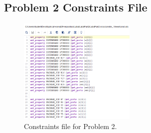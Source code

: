 \documentclass[11pt]{article}
\begin{document}
\begin{appendices}
\section{Problem 2 Constraints File}
\begin{figure}[H]
\begin{center}
	\includegraphics[width=0.5\textwidth]{../report-images/Part2Const.png}
	\caption{\label{fig:Part2ConstFile}Constraints file for Problem 2.}
\end{center}
\end{figure}

\end{appendices}
\end{document}
